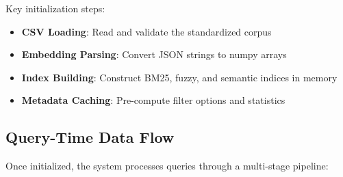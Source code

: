 Key initialization steps:
\begin{itemize}[leftmargin=*,itemsep=2pt,topsep=2pt]
  \item \textbf{CSV Loading}: Read and validate the standardized corpus
  \item \textbf{Embedding Parsing}: Convert JSON strings to numpy arrays
  \item \textbf{Index Building}: Construct BM25, fuzzy, and semantic indices in memory
  \item \textbf{Metadata Caching}: Pre-compute filter options and statistics
\end{itemize}

\subsection{Query-Time Data Flow}

Once initialized, the system processes queries through a multi-stage pipeline:

